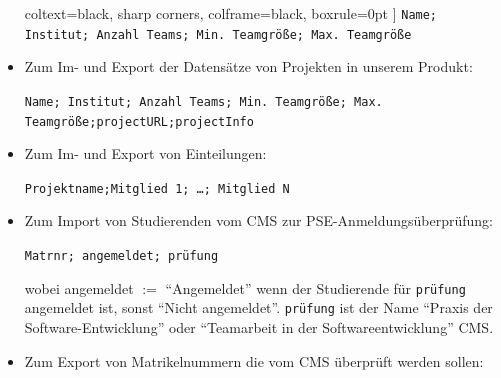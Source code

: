 \documentclass[parskip=full]{scrartcl}
\begin{document}
\begin{itemize}
\begin{tcolorbox}
 coltext=black, %
 sharp corners, %
 colframe=black, %
 boxrule=0pt %
 ]
 \texttt{Name; Institut; Anzahl Teams; Min. Teamgröße; Max. Teamgröße}
  \end{tcolorbox}
  \item Zum Im- und Export der Datensätze von Projekten in unserem Produkt: \\
  \begin{tcolorbox}[enhanced jigsaw, %
 colback=testgrauRGB, %
 coltext=black, %
 sharp corners, %
 colframe=black, %
 boxrule=0pt %
 ]
 \texttt{Name; Institut; Anzahl Teams; Min. Teamgröße; Max. Teamgröße;projectURL;projectInfo}
  \end{tcolorbox}
  \item Zum Im- und Export von Einteilungen: \\ \begin{tcolorbox}[enhanced
  jigsaw,
 colback=testgrauRGB, %
 coltext=black, %
 sharp corners, %
 colframe=black, %
 boxrule=0pt %
 ]
 \texttt{Projektname;Mitglied 1; \ldots ; Mitglied N}
  \end{tcolorbox}
   \item Zum Import von Studierenden vom CMS zur
   PSE-Anmeldungsüberprüfung: 
   \\
   \begin{tcolorbox}[enhanced jigsaw,
 colback=testgrauRGB, %
 coltext=black, %
 sharp corners, %
 colframe=black, %
 boxrule=0pt %
 ]
 \texttt{Matrnr; angemeldet; prüfung}
\end{tcolorbox}
 wobei angemeldet $:=$ \enquote{Angemeldet} wenn der Studierende für
 \texttt{prüfung} angemeldet ist, sonst \enquote{Nicht angemeldet}.
 \texttt{prüfung} ist der Name \enquote{Praxis der Software-Entwicklung} oder
 \enquote{Teamarbeit in der Softwareentwicklung} CMS.
   \item Zum Export von Matrikelnummern die vom CMS überprüft werden sollen: \\

\end{itemize}
\end{document}
